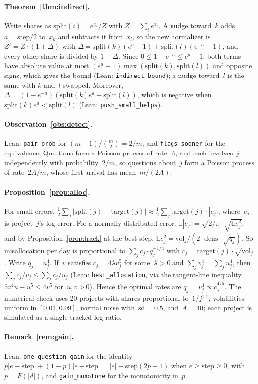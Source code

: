 \documentclass[doubleblind]{ecai}
\theoremstyle{remark}
\newcommand{\Split}{\mathrm{split}}
\newcommand{\target}{\mathrm{target}}
\newcommand{\step}{\mathrm{step}}
\newcommand{\vol}{\mathrm{vol}}
\newcommand{\dens}{\mathrm{dens}}
\newcommand{\sd}{\mathrm{sd}}
\begin{document}
\paragraph{Theorem~\ref{thm:indirect}.}
Write shares as $\Split(i) = e^{x_i}/Z$ with $Z = \sum_i e^{x_i}$. A nudge toward~$k$ adds $a = \step/2$ to~$x_k$ and subtracts it from~$x_l$, so the new normalizer is $Z' = Z\cdot(1+\Delta)$ with $\Delta = \Split(k)(e^{a}-1) + \Split(l)(e^{-a}-1)$, and every other share is divided by $1+\Delta$. Since $0 \le 1-e^{-a} \le e^{a}-1$, both terms have absolute value at most $(e^{a}-1)\max(\Split(k),\Split(l))$ and opposite signs, which gives the bound (Lean: \texttt{indirect\_bound}); a nudge toward~$l$ is the same with $k$ and~$l$ swapped. Moreover, $\Delta = (1-e^{-a})(\Split(k)e^{a} - \Split(l))$, which is negative when $\Split(k)e^{a} < \Split(l)$ (Lean: \texttt{push\_small\_helps}).

\paragraph{Observation~\ref{obs:detect}.}
Lean: \texttt{pair\_prob} for $(m-1)/\binom m2 = 2/m$, and \texttt{flags\_sooner} for the equivalence. Questions form a Poisson process of rate~$A$, and each involves~$j$ independently with probability~$2/m$, so questions about~$j$ form a Poisson process of rate~$2A/m$, whose first arrival has mean~$m/(2A)$.

\paragraph{Proposition~\ref{prop:alloc}.}
For small errors, $\tfrac12\sum_j|\Split(j)-\target(j)| \approx \tfrac12\sum_j \target(j)\cdot|e_j|$, where~$e_j$ is project~$j$'s log error. For a normally distributed error, $\mathbb{E}|e_j| = \sqrt{2/\pi}\cdot\sqrt{\mathbb{E}e_j^2}$, and by Proposition~\ref{prop:track} at the best step, $\mathbb{E}e_j^2 = \vol_j/(2\cdot\dens\cdot\sqrt{q_j})$. So misallocation per day is proportional to $\sum_j c_j\cdot q_j^{-1/4}$ with $c_j = \target(j)\cdot\sqrt{\vol_j}$. Write $q_j = u_j^4$. If~$v$ satisfies $c_j = 4\lambda v_j^5$ for some~$\lambda>0$ and $\sum_j v_j^4 = \sum_j u_j^4$, then $\sum_j c_j/v_j \le \sum_j c_j/u_j$ (Lean: \texttt{best\_allocation}, via the tangent-line inequality $5v^4u - u^5 \le 4v^5$ for~$u,v>0$). Hence the optimal rates are $q_j = v_j^4 \propto c_j^{4/5}$. The numerical check uses 20 projects with shares proportional to~$1/j^{1.1}$, volatilities uniform in $[0.01, 0.09]$, normal noise with~$\sd = 0.5$, and~$A = 40$; each project is simulated as a single tracked log-ratio.

\paragraph{Remark~\ref{rem:gain}.}
Lean: \texttt{one\_question\_gain} for the identity $p|e-\step| + (1-p)|e+\step| = |e| - \step(2p-1)$ when $e\ge\step\ge 0$, with $p = F(|d|)$, and \texttt{gain\_monotone} for the monotonicity in~$p$.
\end{document}
